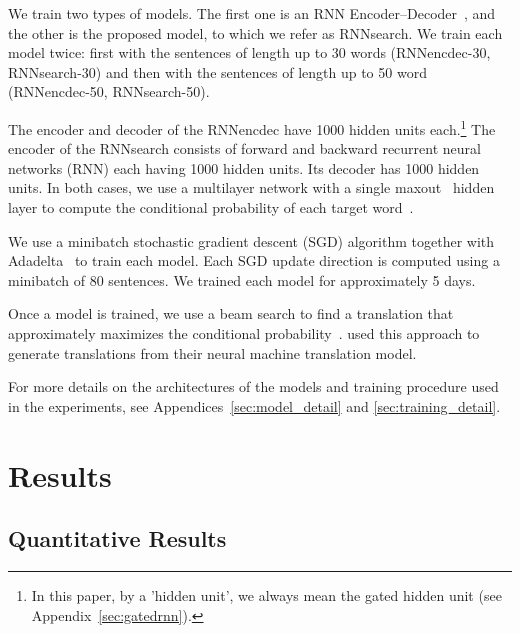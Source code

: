 We train two types of models. The first one is an RNN
Encoder--Decoder~\citep[RNNencdec,][]{Cho2014}, and the other is the proposed
model, to which we refer as RNNsearch. We train each model twice: first with the
sentences of length up to 30 words (RNNencdec-30, RNNsearch-30) and then with the
sentences of length up to 50 word (RNNencdec-50, RNNsearch-50).

The encoder and decoder of the RNNencdec have 1000 hidden units each.\footnote{
    In this paper, by a 'hidden unit', we always mean the gated hidden unit (see
    Appendix~\ref{sec:gatedrnn}).
} The encoder of the RNNsearch consists of forward and backward recurrent neural
networks (RNN) each having 1000 hidden units. Its decoder has 1000 hidden units.
In both cases, we use a multilayer network with a single
maxout~\citep{Goodfellow2013} hidden layer to compute the conditional
probability of each target word~\citep{Pascanu2014rec}.

We use a minibatch stochastic gradient descent (SGD) algorithm together with
Adadelta~\citep{Zeiler2012} to train each model. Each SGD update direction is
computed using a minibatch of 80 sentences. We trained each model for
approximately 5 days.

Once a model is trained, we use a beam search to find a translation that
approximately maximizes the conditional probability~\citep[see,
e.g.,][]{Graves2012,Boulanger2013}. \citet{Sutskever2014} used this approach to
generate translations from their neural machine translation model.

For more details on the architectures of the models and training procedure used
in the experiments, see Appendices~\ref{sec:model_detail} and
\ref{sec:training_detail}.

\section{Results}
\label{sec:exp_results}

\subsection{Quantitative Results}

